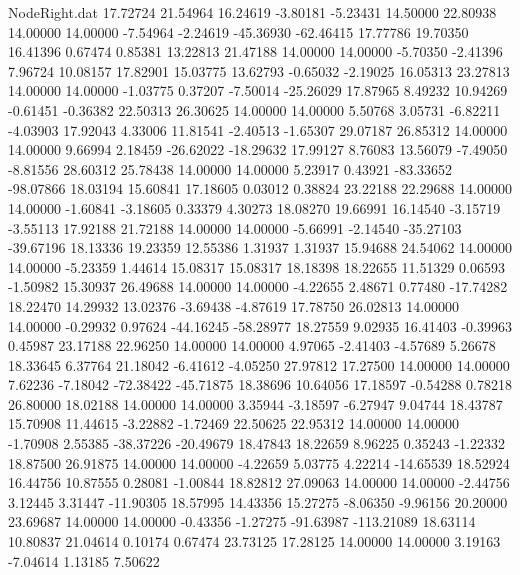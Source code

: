 \begin{filecontents}{NodeRight.dat}
  17.72724   21.54964   16.24619    -3.80181   -5.23431   14.50000   22.80938   14.00000   14.00000   -7.54964   -2.24619  -45.36930  -62.46415
  17.77786   19.70350   16.41396     0.67474    0.85381   13.22813   21.47188   14.00000   14.00000   -5.70350   -2.41396    7.96724   10.08157
  17.82901   15.03775   13.62793    -0.65032   -2.19025   16.05313   23.27813   14.00000   14.00000   -1.03775    0.37207   -7.50014  -25.26029
  17.87965    8.49232   10.94269    -0.61451   -0.36382   22.50313   26.30625   14.00000   14.00000    5.50768    3.05731   -6.82211   -4.03903
  17.92043    4.33006   11.81541    -2.40513   -1.65307   29.07187   26.85312   14.00000   14.00000    9.66994    2.18459  -26.62022  -18.29632
  17.99127    8.76083   13.56079    -7.49050   -8.81556   28.60312   25.78438   14.00000   14.00000    5.23917    0.43921  -83.33652  -98.07866
  18.03194   15.60841   17.18605     0.03012    0.38824   23.22188   22.29688   14.00000   14.00000   -1.60841   -3.18605    0.33379    4.30273
  18.08270   19.66991   16.14540    -3.15719   -3.55113   17.92188   21.72188   14.00000   14.00000   -5.66991   -2.14540  -35.27103  -39.67196
  18.13336   19.23359   12.55386     1.31937    1.31937   15.94688   24.54062   14.00000   14.00000   -5.23359    1.44614   15.08317   15.08317
  18.18398   18.22655   11.51329     0.06593   -1.50982   15.30937   26.49688   14.00000   14.00000   -4.22655    2.48671    0.77480  -17.74282
  18.22470   14.29932   13.02376    -3.69438   -4.87619   17.78750   26.02813   14.00000   14.00000   -0.29932    0.97624  -44.16245  -58.28977
  18.27559    9.02935   16.41403    -0.39963    0.45987   23.17188   22.96250   14.00000   14.00000    4.97065   -2.41403   -4.57689    5.26678
  18.33645    6.37764   21.18042    -6.41612   -4.05250   27.97812   17.27500   14.00000   14.00000    7.62236   -7.18042  -72.38422  -45.71875
  18.38696   10.64056   17.18597    -0.54288    0.78218   26.80000   18.02188   14.00000   14.00000    3.35944   -3.18597   -6.27947    9.04744
  18.43787   15.70908   11.44615    -3.22882   -1.72469   22.50625   22.95312   14.00000   14.00000   -1.70908    2.55385  -38.37226  -20.49679
  18.47843   18.22659    8.96225     0.35243   -1.22332   18.87500   26.91875   14.00000   14.00000   -4.22659    5.03775    4.22214  -14.65539
  18.52924   16.44756   10.87555     0.28081   -1.00844   18.82812   27.09063   14.00000   14.00000   -2.44756    3.12445    3.31447  -11.90305
  18.57995   14.43356   15.27275    -8.06350   -9.96156   20.20000   23.69687   14.00000   14.00000   -0.43356   -1.27275  -91.63987 -113.21089
  18.63114   10.80837   21.04614     0.10174    0.67474   23.73125   17.28125   14.00000   14.00000    3.19163   -7.04614    1.13185    7.50622

\end{filecontents}
